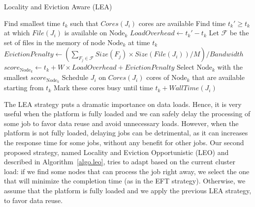 \documentclass[conference,10pt]{IEEEtran}
\newcommand{\Node}[1]{\ensuremath{\mathrm{Node}_{#1}}\xspace}
\newcommand{\file}{\ensuremath{\mathit{File}}\xspace}
\newcommand{\size}{\ensuremath{\mathit{Size}}\xspace}
\newcommand{\memory}{\ensuremath{\mathit{M}}\xspace}
\newcommand{\bandwidth}{\mathit{Bandwidth}\xspace}
\newcommand{\core}{\mathit{Cores}\xspace}
\newcommand{\walltime}{\mathit{WallTime}\xspace}
\newcommand{\nodeset}{\ensuremath{\mathbb{N}}\xspace}
\begin{document}
\begin{algorithm}[htb]%
\caption{Locality and Eviction Aware (LEA)}\label{algo.lea}
\begin{algorithmic}[1]
		\ForEach{$\Node{k} \in \nodeset$}
			\State Find smallest time $t_k$ such that $\core(J_i)$ cores are available
			\State Find time $t_k'\geq t_k$ at which $\file(J_i)$ is available on $\Node{k}$
			\State $\mathit{LoadOverhead} \gets t_k' - t_k$ %
                        \State Let $\mathcal{F}$ be the set of files in the memory of node \Node{k} at time $t_k$
			\State $\mathit{EvictionPenalty} \gets (\sum_{F_j\in\mathcal{F}}\size(F_j) \times \size(\file(J_i))/\memory)/\bandwidth$
			\State $score_{\Node{k}} \gets t_k + W \times \mathit{LoadOverhead} + \mathit{EvictionPenalty}$
		\EndFor
                \State Select \Node{k} with the smallest $score_{\Node{k}}$
                \State Schedule $J_i$ on $\core(J_i)$ cores of \Node{k} that are available starting from $t_k$
                \State Mark these cores busy until time $t_k +\walltime(J_i)$
	\EndFor
\end{algorithmic}
\end{algorithm}


The LEA strategy puts a dramatic importance on data loads. Hence, it
is very useful when the platform is fully loaded and we can safely
delay the processing of some job to favor data reuse and avoid
unnecessary loads. However, when the platform is not fully loaded,
delaying jobs can be detrimental, as it can increases the response
time for some jobs, without any benefit for other jobs. Our second proposed strategy,
named Locality and Eviction Opportunistic (LEO) and described in Algorithm~\ref{algo.leo}, tries to adapt based
on the current cluster load: if we find some nodes that can process the job
right away, we select the one that will minimize the completion time
(as in the EFT strategy). Otherwise, we assume that the platform is
fully loaded and we apply the previous LEA strategy, to favor data reuse.
\end{document}
